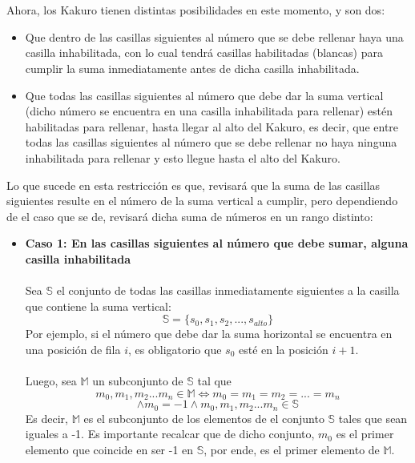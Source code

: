 \documentclass[12pt]{article}
\begin{document}
\begin{itemize}
\\ \\ 
Ahora, los Kakuro tienen distintas posibilidades en este momento, y son dos:
\begin{itemize}
\item Que dentro de las casillas siguientes al número que se debe rellenar haya una casilla inhabilitada, con lo cual tendrá casillas habilitadas (blancas) para cumplir la suma inmediatamente antes de dicha casilla inhabilitada. 
\item Que todas las casillas siguientes al número que debe dar la suma vertical (dicho número se encuentra en una casilla inhabilitada para rellenar) estén habilitadas para rellenar, hasta llegar al alto del Kakuro, es decir, que entre todas las casillas siguientes al número que se debe rellenar no haya ninguna inhabilitada para rellenar y esto llegue hasta el alto del Kakuro.
\end{itemize}
\newpage
Lo que sucede en esta restricción es que, revisará que la suma de las casillas siguientes resulte en el número de la suma vertical a cumplir, pero dependiendo de el caso que se de, revisará dicha suma de números en un rango distinto:
\begin{itemize}
\item \textbf{Caso 1: En las casillas siguientes al número que debe sumar, alguna casilla inhabilitada} \\ \\
Sea $\mathbb{S}$ el conjunto de todas las casillas inmediatamente siguientes a la casilla que contiene la suma vertical:
\begin{equation*}
\mathbb{S} = \{s_0, s_1, s_2, ... , s_{alto}\}
\end{equation*}
Por ejemplo, si el número que debe dar la suma horizontal se encuentra en una posición de fila $i$, es obligatorio que $s_0$ esté en la posición $i+1$.
\\ \\
Luego, sea $\mathbb{M}$ un subconjunto de $\mathbb{S}$ tal que
\begin{equation*}
m_0, m_1, m_2 ... m_n \in \mathbb{M} \Leftrightarrow m_0 = m_1 = m_2 = ... = m_n
\end{equation*}
\begin{equation*}
\land m_0 = -1 \land m_0, m_1, m_2 ... m_n \in \mathbb{S}
\end{equation*} 
Es decir, $\mathbb{M}$ es el subconjunto de los elementos de el conjunto $\mathbb{S}$ tales que sean iguales a -1. Es importante recalcar que de dicho conjunto, $m_0$ es el primer elemento que coincide en ser -1 en $\mathbb{S}$, por ende, es el primer elemento de $\mathbb{M}$.

\end{itemize}
\end{itemize}
\end{document}
